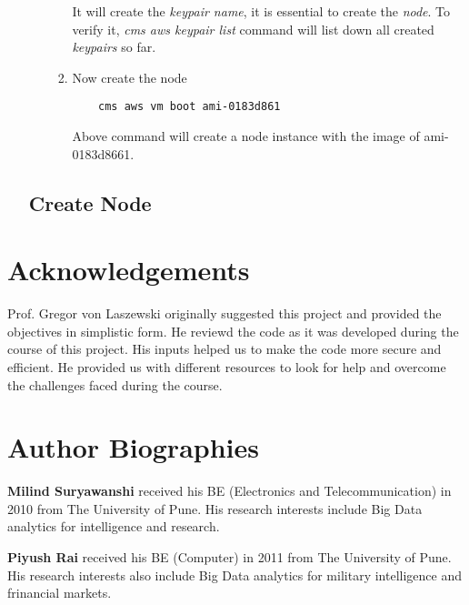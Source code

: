 \documentclass[9pt,twocolumn,twoside]{../../styles/osajnl}
\begin{document}
\begin{enumerate}
\begin{enumerate}
\begin{enumerate}
	It will create the \textit{keypair name}, it is essential to create the \textit{node}. To verify it, \textit{cms aws keypair list} command will list down all created \textit{keypairs} so far.
	
	\item Now create the node 
	
	\begin{verbatim}
	cms aws vm boot ami-0183d861
	\end{verbatim}
	
	Above command will create a node instance with the image of ami-0183d8661.

\end{enumerate}	
	
\end{enumerate}


\subsection{Create Node}

\end{enumerate}

\section*{Acknowledgements}

Prof. Gregor von Laszewski originally suggested this project and provided the objectives in simplistic form. He reviewd the code as it was developed during the course of this project. His inputs helped us to make the code more secure and efficient. He provided us with different resources to look for help and overcome the challenges faced during the course.



 
\section*{Author Biographies}
\begingroup
\setlength\intextsep{0pt}
\begin{minipage}{1.0\columnwidth}
  \noindent
  {\bfseries Milind Suryawanshi} received his BE (Electronics and Telecommunication) in 2010 from
  The University of Pune. His research interests include Big Data analytics for intelligence and research. 
\end{minipage}
\begin{minipage}{1.0\columnwidth} 
  \noindent
  {\bfseries Piyush Rai} received his BE (Computer) in 2011 from
  The University of Pune. His research interests also include Big Data analytics for military intelligence and frinancial markets. 
\end{minipage}
\end{document}
